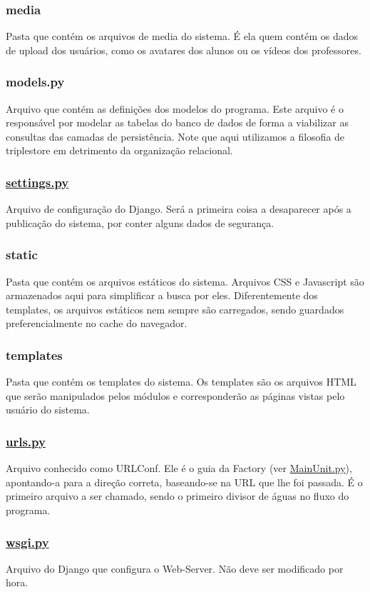 \subsubsection*{media}

Pasta que contém os arquivos de media do sistema. É ela quem contém os dados de upload dos usuários, como os avatares dos alunos ou os vídeos dos professores.

\subsubsection*{models.\-py}

Arquivo que contém as definições dos modelos do programa. Este arquivo é o responsável por modelar as tabelas do banco de dados de forma a viabilizar as consultas das camadas de persistência. Note que aqui utilizamos a filosofia de triplestore em detrimento da organização relacional.

\subsubsection*{\hyperlink{settings_8py}{settings.\-py}}

Arquivo de configuração do Django. Será a primeira coisa a desaparecer após a publicação do sistema, por conter alguns dados de segurança.

\subsubsection*{static}

Pasta que contém os arquivos estáticos do sistema. Arquivos C\-S\-S e Javascript são armazenados aqui para simplificar a busca por eles. Diferentemente dos templates, os arquivos estáticos nem sempre são carregados, sendo guardados preferencialmente no cache do navegador.

\subsubsection*{templates}

Pasta que contém os templates do sistema. Os templates são os arquivos H\-T\-M\-L que serão manipulados pelos módulos e corresponderão as páginas vistas pelo usuário do sistema.

\subsubsection*{\hyperlink{urls_8py}{urls.\-py}}

Arquivo conhecido como U\-R\-L\-Conf. Ele é o guia da Factory (ver \hyperlink{MainUnit_8py}{Main\-Unit.\-py}), apontando-\/a para a direção correta, baseando-\/se na U\-R\-L que lhe foi passada. É o primeiro arquivo a ser chamado, sendo o primeiro divisor de águas no fluxo do programa.

\subsubsection*{\hyperlink{wsgi_8py}{wsgi.\-py}}

Arquivo do Django que configura o Web-\/\-Server. Não deve ser modificado por hora. 